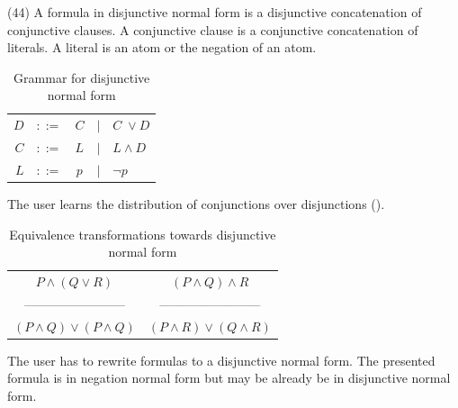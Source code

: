 (44) A formula in disjunctive normal form is a disjunctive concatenation of conjunctive clauses.
A conjunctive clause is a conjunctive concatenation of literals. 
A literal is an atom or the negation of an atom. 

\begin{table}[htdp]
\begin{center}
\begin{tabular}{rcccl}
$D$	&$::=$ & $C$ 	&$|$ & $C \;\vee D$\\
$C$	&$::=$ & $L$ 	&$|$ & $L \wedge D$\\
$L$	&$::=$ & $p$ 	&$|$ & $\neg p$
\end{tabular}
\caption{Grammar for disjunctive normal form}
\label{tab:DNF}
\end{center}
\end{table}

The user learns the distribution of conjunctions over disjunctions ().

\begin{table}[htdp]
\begin{center}
\begin{tabular}{cc}
$P \wedge (Q \vee R)$ 			& $(P \wedge Q) \wedge R$\\
———————— & ————————\\
$(P\wedge Q) \vee (P\wedge Q)$ 	& $(P\wedge R) \vee (Q\wedge R)$
\end{tabular}
\caption{Equivalence transformations towards disjunctive normal form}
\label{tab:ET_DNF}
\end{center}
\end{table}

The user has to rewrite formulas to a disjunctive normal form. 
The presented formula is in negation normal form 
but may be already be in disjunctive normal form.

